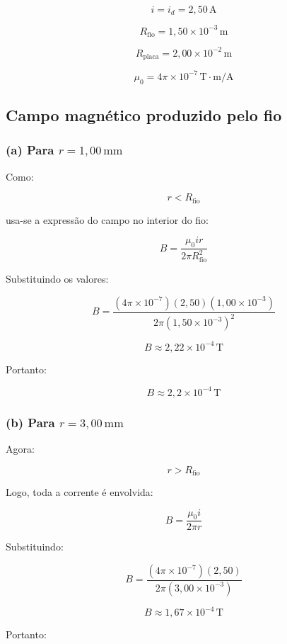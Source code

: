 \documentclass[12pt,a4paper]{article}
\begin{document}
\[
i=i_d=2,50\,\text{A}
\]

\[
R_{\text{fio}} = 1,50\times10^{-3}\,\text{m}
\]

\[
R_{\text{placa}} = 2,00\times10^{-2}\,\text{m}
\]

\[
\mu_0 = 4\pi\times10^{-7}\,\text{T}\cdot\text{m/A}
\]

\subsection*{Campo magnético produzido pelo fio}

\subsubsection*{(a) Para $r = 1,00\,\text{mm}$}

Como:

\[
r < R_{\text{fio}}
\]

usa-se a expressão do campo no interior do fio:

\[
B =
\frac{\mu_0 i r}
{2\pi R_{\text{fio}}^2}
\]

Substituindo os valores:

\[
B =
\frac{
(4\pi\times10^{-7})(2,50)(1,00\times10^{-3})
}
{
2\pi(1,50\times10^{-3})^2
}
\]

\[
B \approx 2,22\times10^{-4}\,\text{T}
\]

Portanto:

\[
\boxed{
B \approx 2,2\times10^{-4}\,\text{T}
}
\]


\subsubsection*{(b) Para $r = 3,00\,\text{mm}$}

Agora:

\[
r > R_{\text{fio}}
\]

Logo, toda a corrente é envolvida:

\[
B =
\frac{\mu_0 i}{2\pi r}
\]

Substituindo:

\[
B =
\frac{
(4\pi\times10^{-7})(2,50)
}
{
2\pi(3,00\times10^{-3})
}
\]

\[
B \approx 1,67\times10^{-4}\,\text{T}
\]

Portanto:
\end{document}
